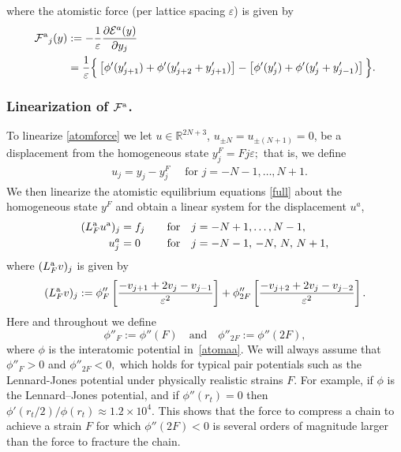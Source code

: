 \documentclass[12pt,reqno]{amsart}
\begin{document}
where the atomistic force (per lattice spacing ${\varepsilon}$) is given by
\begin{equation} \label{atomforce}
\begin{split}
{{\mathcal{F}}^{{\rm a}}}_j(y)
&:=-\frac{1}{\varepsilon}\frac{\partial {\mathcal{E}}^a({y})}{\partial y_j} \\
&=\frac{1}{\varepsilon}\Big\{\left[\phi'(y_{j+1}')
+ \phi'(y_{j+2}'+y_{j+1}')\right]
-\left[\phi'(y_j')
+ \phi'(y_j'+y_{j-1}')\right]\Big\}.
\end{split}
\end{equation}

\subsubsection{Linearization of ${{\mathcal{F}}^{{\rm a}}}$.}
To linearize \eqref{atomforce} we let $u \in {\mathbb{R}}^{2N+3}$, $u_{\pm N} =
u_{\pm (N+1)} = 0$, {{{be a displacement from the homogeneous
  state}}} $y_j^F = Fj{\varepsilon};$ that is, we define
\begin{align*}
  & u_j = y_j - y_j^F  \quad \text{ for } j = -N-1,\dots,N+1.
\end{align*}
We then linearize the atomistic equilibrium equations \eqref{full}
about the homogeneous state ${y}^F$ and obtain a linear system for the
displacement ${u}^a$,
\begin{equation*}
\begin{aligned}
({L^{{\rm a}}_F} {u^{{\rm a}}})_j&=f_j&\quad&\text{for} \quad j = -N+1, \dots, N-1,\\
u^{a}_{j}&=0&\quad&\text{for} \quad j = -N-1,\,-N,\,N,\,N+1,
\end{aligned}
\end{equation*}
where $({L^{{\rm a}}_F}{v})_j$ is
given by
\begin{equation*}
({L^{{\rm a}}_F} {v})_j:=\phi''_F
      \left[\frac{-v_{j+1} + 2 v_{j} - v_{j-1}}{{\varepsilon}^2} \right]
      + \phi''_{2F}
      \left[\frac{-v_{j+2} + 2 v_{j} - v_{j-2}}{{\varepsilon}^2} \right].
\end{equation*}
Here and throughout we define
\[
\phi''_{F} := \phi''(F)\quad\text{and}\quad
\phi''_{2F} := \phi''(2F),
\]
where $\phi$ is the interatomic potential in~\eqref{atomaa}.  We will
always assume that $\phi''_F > 0$ and $\phi''_{2F} < 0,$ which holds
for typical pair potentials such as the Lennard-Jones potential under
physically realistic strains $F$. {{{For example, if $\phi$ is the
  Lennard--Jones potential, and if $\phi''(r_t) = 0$ then
  $\phi'(r_t/2) / \phi(r_t) \approx 1.2 \times 10^4$. This shows that
  the force to compress a chain to achieve a strain $F$ for which
  $\phi''(2F) < 0$ is several orders of magnitude larger than the
  force to fracture the chain.}}}
\end{document}
